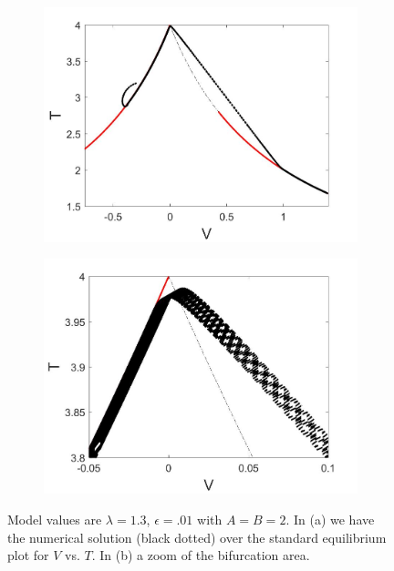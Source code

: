 \begin{figure}[H]
\centering
\begin{subfigure}{.5\textwidth}
  \centering
  \includegraphics[width=\linewidth]{twoD/slowosc_Tplot_medium.jpg}
  \caption{}
\end{subfigure}%
\begin{subfigure}{.5\textwidth}
  \centering
  \includegraphics[width=\linewidth]{twoD/slowosc_Tplot_medium_zoom.jpg}
  \caption{}
\end{subfigure}
\caption{Model values are $\lambda=1.3$, $\epsilon=.01$ with $A=B=2$. In (a) we have the numerical solution (black dotted) over the standard equilibrium plot for $V$ vs. $T$. In (b) a zoom of the bifurcation area.}
\label{fig:twoD_slowosc_Tnumerics_medium}
\end{figure}

